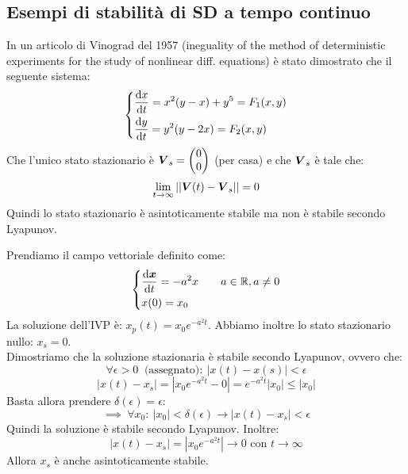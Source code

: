 \subsection{Esempi di stabilità di SD a tempo continuo}%
\begin{exmp}[Vinograd]
In un articolo di Vinograd del 1957 (ineguality of the method of deterministic experiments for the study of nonlinear diff. equations) è stato dimostrato che il seguente sistema:
\[\begin{dcases}
    \frac{\text{d} x}{\text{d} t} = x^2(y-x)+y^5 = F_1(x, y)\\
    \frac{\text{d} y}{\text{d} t} = y^2(y-2x)= F_2(x, y)
\end{dcases}\] 
Che l'unico stato stazionario è $\boldsymbol{V}_s = \begin{pmatrix} 0 \\ 0 \end{pmatrix}$ (per casa)  e che $\boldsymbol{V}_s$  è tale che:
\[
    \lim_{t \to \infty} \left|\left|\boldsymbol{V} (t)-\boldsymbol{V}_s\right|\right|=0
\] 
Quindi lo stato stazionario è asintoticamente stabile ma non è stabile secondo Lyapunov.
\end{exmp}
\noindent
\begin{exmp}[1]
    Prendiamo il campo vettoriale definito come:
    \[\begin{dcases}
        \frac{\text{d} \boldsymbol{x}}{\text{d} t} = - a^2x \qquad a \in \mathbb{R}, a\neq 0\\
	x(0)=x_0	
    \end{dcases}\] 
    La soluzione dell'IVP è: $x_p(t)= x_0e^{-a^2t}$. Abbiamo inoltre lo stato stazionario nullo: $x_s = 0$. \\
    Dimostriamo che la soluzione stazionaria è stabile secondo Lyapunov, ovvero che:
    \[
	\forall \epsilon>0  \  \text{ (assegnato)}: \ \left|x(t)-x(s)\right|<\epsilon
    \] 
    \[
	\left|x(t)-x_s\right|= \left|x_0e^{-a^2t}-0\right| = e^{-a^2t}\left|x_0\right| \le \left|x_0\right|
    \] 
    Basta allora prendere $\delta (\epsilon)=\epsilon$:
    \[
	\implies  \ \forall x_0: \ \left|x_0\right|<\delta (\epsilon) \to \left|x(t)-x_s\right|<\epsilon
    \] 
    Quindi la soluzione è stabile secondo Lyapunov. Inoltre:
    \[
	\left|x(t)-x_s\right|=\left|x_0e^{-a^2t}\right|\to 0 \text{ con } t\to \infty
    \] 
    Allora $x_s$ è anche asintoticamente stabile.
\end{exmp}
\noindent
